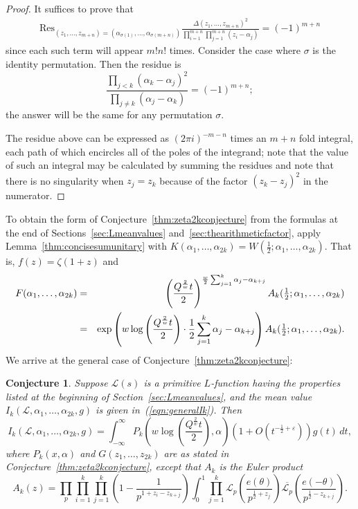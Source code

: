 \documentclass[12pt,letterpaper]{amsart}
\theoremstyle{plain}
\newtheorem{conjecture}[theorem]{Conjecture}
\theoremstyle{definition}
\theoremstyle{remark}
\numberwithin{equation}{subsection}
\numberwithin{theorem}{subsection}
\numberwithin{table}{subsection}
\def\({\left(}
\def\){\right)}
\begin{document}
\begin{proof}
 It suffices to prove that
\begin{eqnarray*}
\mbox{Res}_{(z_1,\dots,z_{m+n})=
 (\alpha_{\sigma(1)},\dots,\alpha_{\sigma(m+n)})}
\frac{\Delta(z_1,\dots,z_{m+n})^2}{\prod_{i=1}^{m+n}\prod_{j=1}^{m+n}
(z_i-\alpha_j)}=(-1)^{m+n}
\end{eqnarray*}
since each such term will appear $m!n!$ times. Consider the case
where $\sigma$ is the identity permutation. Then the residue is
$$
\frac{\prod_{j<k}(\alpha_k-\alpha_j)^2}
{\prod_{j\ne k}(\alpha_j-\alpha_k)}=(-1)^{m+n};$$ the answer will
be the same for any permutation $\sigma$.

The residue above can be expressed as $(2\pi i)^{-m-n}$ times an
$m+n$ fold integral, each path of which encircles all of the poles
of the integrand; note that the value of such an integral may be
calculated by summing the residues and note that there is no
singularity when $z_j=z_k$ because of the factor $(z_k-z_j)^2$ in
the numerator.

\end{proof}

To obtain the form of Conjecture~\ref{thm:zeta2kconjecture} from the formulas at the end of
Sections~\ref{sec:Lmeanvalues} and~\ref{sec:thearithmeticfactor}, 
apply  Lemma~\ref{thm:concisesumunitary}
with $K(\alpha_1,\dots,\alpha_{2k})  =  W(\frac12;\alpha_1,\dots,\alpha_{2k})$. That is,
$f(z)=\zeta(1+z)$ and 
\begin{eqnarray}
F(\alpha_1,\dots,\alpha_{2k}) & = &
\left( \frac{Q^{\frac 2w}t}{2}
\right)^{\frac{w}{2} \sum_{j=1}^k \alpha _j-\alpha _{k+j}}
A_k(\tfrac12;\alpha_1,\dots,\alpha_{2k})\cr
 & = &
\exp\left(w\log\( \frac{Q^{\frac 2w}t}{2}\)
\cdot {\frac{1}{2} \sum_{j=1}^k \alpha _j-\alpha _{k+j}}
\right)
A_k(\tfrac12;\alpha_1,\dots,\alpha_{2k}).
\end{eqnarray}
We arrive at the general case of Conjecture~\ref{thm:zeta2kconjecture}:
\begin{conjecture} \label{thm:general2kconjecture}
 Suppose 
$\mathcal{L}(s)$ is a primitive $L$-function having
the properties listed at the beginning of Section~\ref{sec:Lmeanvalues},
and the mean value  $I_k(\mathcal{L},\alpha_1,\dots, \alpha_{2k},g)$
is given in~(\ref{eqn:generalIk}).  Then
\begin{equation}
I_k(\mathcal{L},\alpha_1,\dots, \alpha_{2k},g) =
\int_{-\infty}^\infty 
P_k\left(w \log \(\frac{Q^{\frac{2}{w}} t}{2}\) , \alpha\right) 
(1+O(t^{-\frac{1}{2}+\varepsilon})) g(t)\,dt ,
\end{equation}
where $P_k(x,\alpha)$ and $G(z_1,\dots,z_{2k})$ are as stated in 
Conjecture~\ref{thm:zeta2kconjecture}, except that
$A_k$ is the Euler product
\begin{equation}
A_k(z) =\prod_p \prod_{i=1}^k\prod_{j=1}^k
\left(1-\frac{1}{p^{1+z_i-z_{k+j}}}\right) \int_0^1 \prod_{j=1}^k
\mathcal{L}_p\left(\frac{e(\theta)}{p^{\frac12+z_j}}\right)
\overline{\mathcal{L}_p}\left(\frac{e(-\theta)}{p^{\frac12-z_{k+j}}}\right) .
\end{equation}
\end{conjecture}
\end{document}
